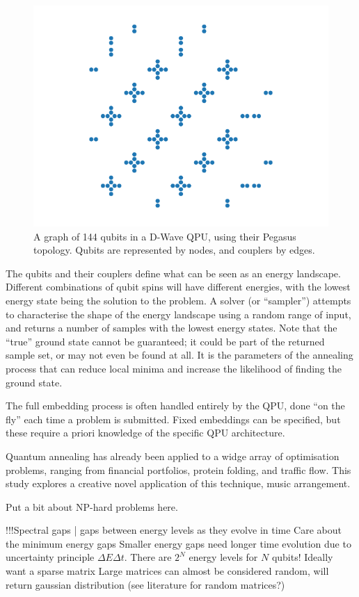 \documentclass[12pt]{article}
\theoremstyle{definition}
\begin{document}
\begin{figure}[b]
    \centering
    \includegraphics[width=0.5\linewidth]{../Figures/pegasus.pdf}
    \caption{A graph of 144 qubits in a D-Wave QPU, using their Pegasus topology. Qubits are represented by nodes, and couplers by edges.}
    \label{fig:pegasus}
\end{figure}

The qubits and their couplers define what can be seen as an energy landscape. Different combinations of qubit spins will have different energies, with the lowest energy state being the solution to the problem. A solver (or ``sampler'') attempts to characterise the shape of the energy landscape using a random range of input, and returns a number of samples with the lowest energy states. Note that the ``true'' ground state cannot be guaranteed; it could be part of the returned sample set, or may not even be found at all. It is the parameters of the annealing process that can reduce local minima and increase the likelihood of finding the ground state.

The full embedding process is often handled entirely by the QPU, done ``on the fly'' each time a problem is submitted. Fixed embeddings can be specified, but these require a priori knowledge of the specific QPU architecture.

Quantum annealing has already been applied to a widge array of optimisation problems, ranging from financial portfolios, protein folding, and traffic flow. This study explores a creative novel application of this technique, music arrangement.

Put a bit about NP-hard problems here.

!!!Spectral gaps | gaps between energy levels as they evolve in time
Care about the minimum energy gaps
Smaller energy gaps need longer time evolution due to uncertainty principle $\Delta E \Delta t$.
There are $2^N$ energy levels for $N$ qubits! Ideally want a sparse matrix
Large matrices can almost be considered random, will return gaussian distribution (see literature for random matrices?)
\end{document}
